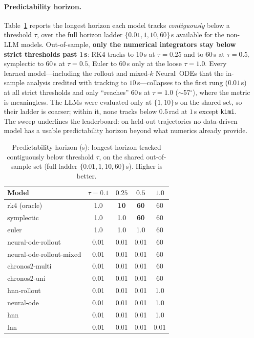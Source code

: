 \documentclass{article}
\begin{document}
\paragraph{Predictability horizon.} Table~\ref{tab:predhorizon} reports the longest
horizon each model tracks \emph{contiguously} below a threshold $\tau$, over the full
horizon ladder $\{0.01,1,10,60\}$\,s available for the non-LLM models. Out-of-sample,
\textbf{only the numerical integrators stay below strict thresholds past $1$\,s}: RK4
tracks to $10$\,s at $\tau{=}0.25$ and to $60$\,s at $\tau{=}0.5$, symplectic to
$60$\,s at $\tau{=}0.5$, Euler to $60$\,s only at the loose $\tau{=}1.0$. Every
learned model---including the rollout and mixed-$k$ Neural~ODEs that the in-sample
analysis credited with tracking to $10$\,s---collapses to the first rung
($0.01$\,s) at all strict thresholds and only ``reaches'' $60$\,s at $\tau{=}1.0$
($\sim$57$^\circ$), where the metric is meaningless. The LLMs were evaluated only at
$\{1,10\}$\,s on the shared set, so their ladder is coarser; within it, none tracks
below $0.5$\,rad at $1$\,s except \texttt{kimi}. The sweep underlines the leaderboard:
on held-out trajectories no data-driven model has a usable predictability horizon
beyond what numerics already provide.

\begin{table}[t]
\centering\small
\caption{Predictability horizon (s): longest horizon tracked contiguously below
threshold $\tau$, on the shared out-of-sample set (full ladder
$\{0.01,1,10,60\}$\,s). Higher is better.}
\label{tab:predhorizon}
\begin{tabular}{lcccc}
\toprule
Model & $\tau{=}0.1$ & $0.25$ & $0.5$ & $1.0$ \\
\midrule
rk4 (oracle) & 1.0 & \textbf{10} & \textbf{60} & 60 \\
symplectic & 1.0 & 1.0 & \textbf{60} & 60 \\
euler & 1.0 & 1.0 & 1.0 & 60 \\
neural-ode-rollout & 0.01 & 0.01 & 0.01 & 60 \\
neural-ode-rollout-mixed & 0.01 & 0.01 & 0.01 & 60 \\
chronos2-multi & 0.01 & 0.01 & 0.01 & 60 \\
chronos2-uni & 0.01 & 0.01 & 0.01 & 60 \\
hnn-rollout & 0.01 & 0.01 & 0.01 & 1.0 \\
neural-ode & 0.01 & 0.01 & 0.01 & 1.0 \\
hnn & 0.01 & 0.01 & 0.01 & 1.0 \\
lnn & 0.01 & 0.01 & 0.01 & 0.01 \\
\bottomrule
\end{tabular}
\end{table}
\end{document}
